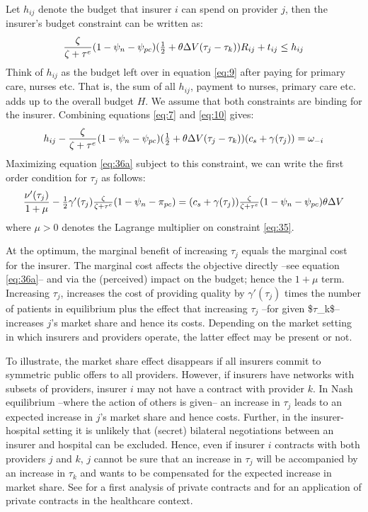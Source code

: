 \documentclass[12pt,english,a4paper]{article}
\begin{document}
Let \(h_{ij}\) denote the budget that insurer \(i\) can spend on provider \(j\), then the insurer's budget constraint can be written as:
\begin{equation}
\label{eq:10}
\frac{\zeta}{\zeta+\tau^e}(1-\psi_n-\psi_{pc})( \textstyle{1\over 2} + \theta \Delta V (\tau_j - \tau_k))R_{ij} + t_{ij} \leq h_{ij}
\end{equation}
Think of \(h_{ij}\) as the budget left over in equation \eqref{eq:9} after paying for primary care, nurses etc. That is, the sum of all \(h_{ij}\), payment to nurses, primary care etc. adds up to the overall budget \(H\). We assume that both constraints are binding for the insurer. Combining equations \eqref{eq:7} and \eqref{eq:10} gives:
\begin{equation}
\label{eq:35}
h_{ij}-\frac{\zeta}{\zeta+\tau^e}(1-\psi_n-\psi_{pc}) (\textstyle{1\over 2}+ \theta \Delta V (\tau_j - \tau_k)) (c_s+\gamma (\tau_j)) = \omega_{-i}
\end{equation}
Maximizing equation \eqref{eq:36a} subject to this constraint, we can write the first order condition for \(\tau_j\) as follows:
\begin{equation}
\label{eq:37} 
\frac{\nu'(\tau_j)}{1+\mu} - \textstyle{1\over 2} \gamma'(\tau_j) \frac{\zeta}{\zeta+\tau^e}(1-\psi_n-\pi_{pc}) = (c_s+\gamma(\tau_j)) \frac{\zeta}{\zeta+\tau^e} (1-\psi_n -\psi_{pc})\theta \Delta V 
\end{equation}
where \(\mu>0\) denotes the Lagrange multiplier on constraint \eqref{eq:35}.

At the optimum, the marginal benefit of increasing \(\tau_j\) equals the marginal cost for the insurer. The marginal cost affects the objective directly --see equation \eqref{eq:36a}-- and via the (perceived) impact on the budget; hence the \(1+\mu\) term. Increasing \(\tau_j\), increases the cost of providing quality by \(\gamma'(\tau_j)\) times the number of patients in equilibrium plus the effect that increasing \(\tau_j\) --for given \$\(\tau\)\_k\$-- increases \(j\)'s market share and hence its costs. Depending on the market setting in which insurers and providers operate, the latter effect may be present or not.

To illustrate, the market share effect disappears if all insurers commit to symmetric public offers to all providers. However, if insurers have networks with subsets of providers, insurer \(i\) may not have a contract with provider \(k\). In Nash equilibrium --where the action of others is given-- an increase in \(\tau_j\) leads to an expected increase in \(j\)'s market share and hence costs. Further, in the insurer-hospital setting it is unlikely that (secret) bilateral negotiations between an insurer and hospital can be excluded. Hence, even if insurer \(i\) contracts with both providers \(j\) and \(k\), \(j\) cannot be sure that an increase in \(\tau_j\) will be accompanied by an increase in \(\tau_k\) and wants to be compensated for the expected increase in market share. See \cite{HartTirole} for a first analysis of private contracts and \cite{BOONE2019102222} for an application of private contracts in the healthcare context.
\end{document}
